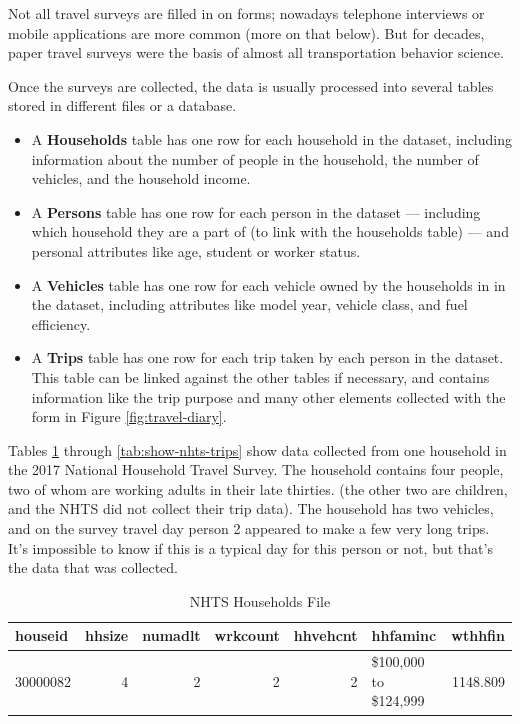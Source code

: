 \documentclass[
]{book}
\providecommand{\tightlist}{%
  \setlength{\itemsep}{0pt}\setlength{\parskip}{0pt}}
\begin{document}
Not all travel surveys are filled in on forms; nowadays telephone interviews or
mobile applications are more common (more on that below). But for decades, paper
travel surveys were the basis of almost all transportation behavior science.

Once the surveys are collected, the data is usually processed into several tables
stored in different files or a database.

\begin{itemize}
\tightlist
\item
  A \textbf{Households} table has one row for each household in the dataset, including
  information about the number of people in the household, the number of vehicles,
  and the household income.
\item
  A \textbf{Persons} table has one row for each person in the dataset --- including
  which household they are a part of (to link with the households table) --- and
  personal attributes like age, student or worker status.
\item
  A \textbf{Vehicles} table has one row for each vehicle owned by the households in
  in the dataset, including attributes like model year, vehicle class, and fuel
  efficiency.
\item
  A \textbf{Trips} table has one row for each trip taken by each person in the dataset.
  This table can be linked against the other tables if necessary, and contains
  information like the trip purpose and many other elements collected with the form
  in Figure \ref{fig:travel-diary}.
\end{itemize}

Tables \ref{tab:show-nhts-hh} through \ref{tab:show-nhts-trips} show
data collected from one household in the 2017 National Household Travel Survey.
The household contains four people, two of whom are working adults in their late
thirties. (the other two are children, and the NHTS did not collect their trip
data). The household has two vehicles, and on the survey travel day person 2
appeared to make a few very long trips. It's impossible to know if this
is a typical day for this person or not, but that's the data that was collected.

\begin{table}

\caption{\label{tab:show-nhts-hh}NHTS Households File}
\centering
\begin{tabular}[t]{l|r|r|r|r|l|r}
\hline
houseid & hhsize & numadlt & wrkcount & hhvehcnt & hhfaminc & wthhfin\\
\hline
30000082 & 4 & 2 & 2 & 2 & \$100,000 to \$124,999 & 1148.809\\
\hline
\end{tabular}
\end{table}
\end{document}
